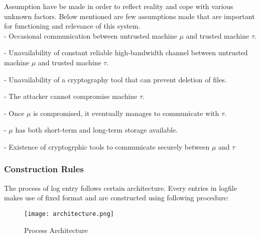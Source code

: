 \documentclass[12pt, letter]{article}
\begin{document}
Assumption have be made in order to reflect reality and cope with various unknown factors. Below mentioned are few assumptions made that are important for functioning and relevance of this system.\\

- Occasional communication between untrusted machine $\mu$ and trusted machine $\tau$.

- Unavailability of constant reliable high-bandwidth channel between untrusted machine $\mu$ and trusted machine $\tau$.

- Unavailability of a cryptography tool that can prevent deletion of files.

- The attacker cannot compromise machine $\tau$.

- Once $\mu$ is compromised, it eventually manages to communicate with $\tau$.

- $\mu$ has both short-term and long-term storage available.

- Existence of cryptogrphic tools to communicate securely between $\mu$ and $\tau$

\subsubsection{Construction Rules}

The process of log entry follows certain architecture. Every entries in logfile makes use of fixed format and are constructed using following procedure:

\begin{figure}
    \centering
    \texttt{[image: architecture.png]}
    \caption{Process Architecture}
    \label{fig:architecture}
\end{figure}
\end{document}
